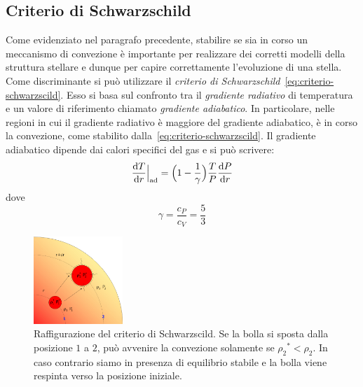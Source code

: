 \subsection{Criterio di Schwarzschild}
Come evidenziato nel paragrafo precedente, stabilire se sia in corso un meccanismo di convezione è importante per realizzare dei corretti modelli della struttura stellare e dunque per capire correttamente l'evoluzione di una stella. Come discriminante si può utilizzare il \emph{criterio di Schwarzschild}~\eqref{eq:criterio-schwarzscild}. Esso si basa sul confronto tra il \emph{gradiente radiativo} di temperatura e un valore di riferimento chiamato \emph{gradiente adiabatico}. In particolare, nelle regioni in cui il gradiente radiativo è maggiore del gradiente adiabatico, è in corso la convezione, come stabilito dalla~\eqref{eq:criterio-schwarzscild}. Il gradiente adiabatico dipende dai calori specifici del gas e si può scrivere:
\begin{equation}\label{eq:gradiente-adiabatico}
    \dfrac{\mathop{\mathrm{{}d}}\mathopen{} T}{\mathop{\mathrm{{}d}}\mathopen{} r}\Big|_\textup{ad} = \Bigl(1- \frac{1}{\gamma}\Bigr) \dfrac{T}{P} \dfrac{\mathop{\mathrm{{}d}}\mathopen{} P}{\mathop{\mathrm{{}d}}\mathopen{} r}
\end{equation}
dove
\[
\gamma =\frac{c_P}{c_V} = \frac{5}{3}
\]

\begin{figure}
\centering
\includegraphics[width=0.3\textwidth]{immagini/criterio-schwarzscild.png}
\caption{Raffigurazione del criterio di Schwarzscild. Se la bolla si sposta dalla posizione $1$ a $2$, può avvenire la convezione solamente se ${\rho_2}^* < \rho_2$. In caso contrario siamo in presenza di equilibrio stabile e la bolla viene respinta verso la posizione iniziale.}
\label{fig:criterio-schwarzscild}
\end{figure}

